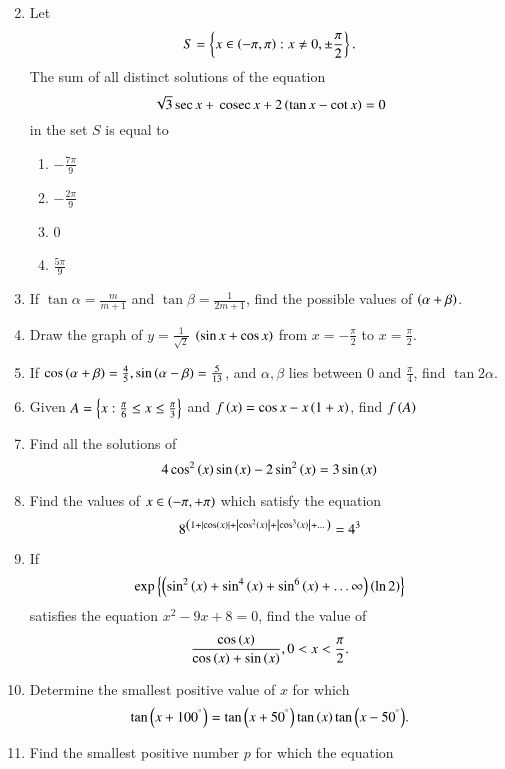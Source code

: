 \begin{enumerate}[label=\thesubsection.\arabic*,ref=\thesubsection.\theenumi]
\begin{multicols}{2}
\end{multicols}
\item Let $$S = \left\{x \in \left(-\pi,\pi\right) : x \neq 0, \pm \frac{\pi}{2}\right\}.$$ The sum of all distinct solutions of the equation $$\sqrt{3} \sec x + \,\text{cosec}\, x + 2\left(\tan x - \cot x\right) = 0$$ in the set $S$ is equal to
\hfill{}
\begin{multicols}{4}
\begin{enumerate}
\item $-\frac{7\pi}{9}$
\item $-\frac{2\pi}{9}$
\item 0
\item $\frac{5\pi}{9}$
\end{enumerate}
\end{multicols}
\item If $\tan{\alpha}=\frac{m}{m+1}$ and $\tan{\beta}=\frac{1}{2m+1}$, find the possible values of $\left(\alpha+\beta\right)$. \hfill{}
    \item Draw the graph of $y=\frac{1}{\sqrt{2}}$ $\left(\sin {x}+\cos {x}\right)$ from $x=-\frac{\pi}{2}$ to $x=\frac{\pi}{2}$.
    \item If $\cos{\ensuremath{\left(\alpha+\beta\right)}}=\frac{4}{5}, \sin{\ensuremath{\left(\alpha-\beta\right)}}=\frac{5}{13}$, and $\alpha,\beta$ lies between $0$ and $\frac{\pi}{4}$, find $\tan{2\alpha}$. \hfill{}
\item Given $A=\left\{x:\frac{\pi}{6}\le x\le\frac{\pi}{3}\right\}$ and $f\left(x\right)=\cos{x-x\ensuremath{\left(1+x\right)}}$, find $f\left(A\right)$ \hfill{}
\item Find all the solutions of 
\hfill{}
$$
4\cos^2\left(x\right) \sin \left(x\right) -2\sin^2\left(x\right) = 3\sin \left(x\right)
$$
\item Find the values of $x \in \left(-\pi, +\pi\right)$ which satisfy the equation
\hfill{}
$$
8^{\left(1+\left\vert\cos \left(x\right)\right\vert+\left\vert\cos^2\left(x\right)\right\vert+\left\vert\cos^3\left(x\right)\right\vert+\dots\right)}= 4^3
$$
\item If 
\hfill{}
$$
	\exp \left\{\left(\sin^2\left(x\right)+\sin^4\left(x\right)+\sin^6\left(x\right)+\dots\infty\right)\left(\ln 2\right)\right\}
$$
satisfies the equation $x^2-9x+8 =0$, find the value of $$\frac{\cos \left(x\right)}{\cos \left(x\right) + \sin \left(x\right)}, 0<x<\frac{\pi}{2}.$$
\item Determine the smallest positive value of $x$  for which 
$$
\tan {\ensuremath{\left(x+100^{\degree}\right)}}=\tan {\ensuremath{\left(x+50^{\degree}\right)}}\tan \left(x\right)\tan {\ensuremath{\left(x-50^{\degree}\right)}}.
$$
\hfill{}
\item Find the smallest positive number $p$ for which the equation 
\hfill{}

\end{enumerate}
